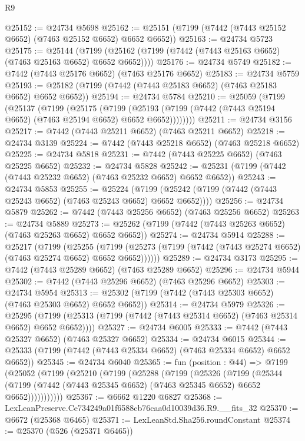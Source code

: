 \begin{lexlean}{R9}
\begin{coremodule}
@25152 := @24734 @5698
@25162 := @25151 (@7199 (@7442 (@7443 @25152 @6652) (@7463 @25152 @6652) @6652 @6652))
@25163 := @24734 @5723
@25175 := @25144
    (@7199 (@25162 (@7199 (@7442 (@7443 @25163 @6652) (@7463 @25163 @6652) @6652 @6652))))
@25176 := @24734 @5749
@25182 := @7442 (@7443 @25176 @6652) (@7463 @25176 @6652)
@25183 := @24734 @5759
@25193 := @25182 (@7199 (@7442 (@7443 @25183 @6652) (@7463 @25183 @6652) @6652 @6652))
@25194 := @24734 @5784
@25210 := @25059
    (@7199
      (@25137
        (@7199
          (@25175
            (@7199
              (@25193 (@7199 (@7442 (@7443 @25194 @6652) (@7463 @25194 @6652) @6652 @6652))))))))
@25211 := @24734 @3156
@25217 := @7442 (@7443 @25211 @6652) (@7463 @25211 @6652)
@25218 := @24734 @3139
@25224 := @7442 (@7443 @25218 @6652) (@7463 @25218 @6652)
@25225 := @24734 @5818
@25231 := @7442 (@7443 @25225 @6652) (@7463 @25225 @6652)
@25232 := @24734 @5828
@25242 := @25231 (@7199 (@7442 (@7443 @25232 @6652) (@7463 @25232 @6652) @6652 @6652))
@25243 := @24734 @5853
@25255 := @25224
    (@7199 (@25242 (@7199 (@7442 (@7443 @25243 @6652) (@7463 @25243 @6652) @6652 @6652))))
@25256 := @24734 @5879
@25262 := @7442 (@7443 @25256 @6652) (@7463 @25256 @6652)
@25263 := @24734 @5889
@25273 := @25262 (@7199 (@7442 (@7443 @25263 @6652) (@7463 @25263 @6652) @6652 @6652))
@25274 := @24734 @5914
@25288 := @25217
    (@7199
      (@25255
        (@7199 (@25273 (@7199 (@7442 (@7443 @25274 @6652) (@7463 @25274 @6652) @6652 @6652))))))
@25289 := @24734 @3173
@25295 := @7442 (@7443 @25289 @6652) (@7463 @25289 @6652)
@25296 := @24734 @5944
@25302 := @7442 (@7443 @25296 @6652) (@7463 @25296 @6652)
@25303 := @24734 @5954
@25313 := @25302 (@7199 (@7442 (@7443 @25303 @6652) (@7463 @25303 @6652) @6652 @6652))
@25314 := @24734 @5979
@25326 := @25295
    (@7199 (@25313 (@7199 (@7442 (@7443 @25314 @6652) (@7463 @25314 @6652) @6652 @6652))))
@25327 := @24734 @6005
@25333 := @7442 (@7443 @25327 @6652) (@7463 @25327 @6652)
@25334 := @24734 @6015
@25344 := @25333 (@7199 (@7442 (@7443 @25334 @6652) (@7463 @25334 @6652) @6652 @6652))
@25345 := @24734 @6040
@25365 := fun (position : @44) =>
  @7199
    (@25052
      (@7199
        (@25210
          (@7199
            (@25288
              (@7199
                (@25326
                  (@7199
                    (@25344
                      (@7199 (@7442 (@7443 @25345 @6652) (@7463 @25345 @6652) @6652 @6652)))))))))))
@25367 := @6662 @1220 @6827
@25368 := LexLeanPreserve.Ce734249a01f6588cb76caa0d10039d36.R9.__fits_32
@25370 := @6672 (@25368 @6465)
@25371 := LexLeanStd.Sha256.roundConstant
@25374 := @25370 (@526 (@25371 @6465))

\end{coremodule}
\end{lexlean}
